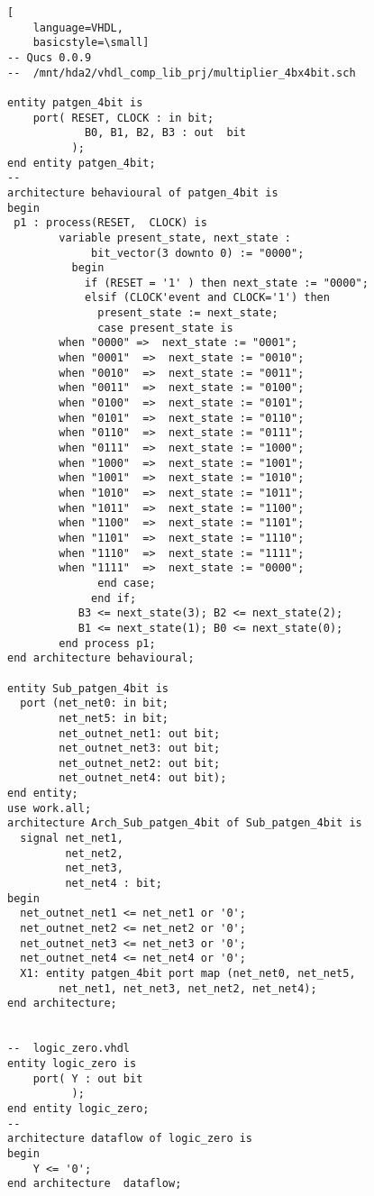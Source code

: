 \FloatBarrier
\begin{lstlisting}[
    language=VHDL,
    basicstyle=\small]
-- Qucs 0.0.9  
--  /mnt/hda2/vhdl_comp_lib_prj/multiplier_4bx4bit.sch

entity patgen_4bit is
	port( RESET, CLOCK : in bit;
	        B0, B1, B2, B3 : out  bit
	      );
end entity patgen_4bit;
--
architecture behavioural of patgen_4bit is
begin
 p1 : process(RESET,  CLOCK) is
        variable present_state, next_state : 
             bit_vector(3 downto 0) := "0000";
          begin	
            if (RESET = '1' ) then next_state := "0000";
            elsif (CLOCK'event and CLOCK='1') then
              present_state := next_state;
              case present_state is
	    when "0000" =>  next_state := "0001";   
	    when "0001"  =>  next_state := "0010"; 
	    when "0010"  =>  next_state := "0011";  
	    when "0011"  =>  next_state := "0100";   
	    when "0100"  =>  next_state := "0101";   
	    when "0101"  =>  next_state := "0110";   
	    when "0110"  =>  next_state := "0111";   
	    when "0111"  =>  next_state := "1000";   
	    when "1000"  =>  next_state := "1001";   
	    when "1001"  =>  next_state := "1010"; 
	    when "1010"  =>  next_state := "1011"; 
	    when "1011"  =>  next_state := "1100"; 
	    when "1100"  =>  next_state := "1101"; 
	    when "1101"  =>  next_state := "1110"; 
	    when "1110"  =>  next_state := "1111"; 
	    when "1111"  =>  next_state := "0000";
              end case;
             end if;
           B3 <= next_state(3); B2 <= next_state(2); 
           B1 <= next_state(1); B0 <= next_state(0);
        end process p1;
end architecture behavioural;

entity Sub_patgen_4bit is
  port (net_net0: in bit;
        net_net5: in bit;
        net_outnet_net1: out bit;
        net_outnet_net3: out bit;
        net_outnet_net2: out bit;
        net_outnet_net4: out bit);
end entity;
use work.all;
architecture Arch_Sub_patgen_4bit of Sub_patgen_4bit is
  signal net_net1,
         net_net2,
         net_net3,
         net_net4 : bit;
begin
  net_outnet_net1 <= net_net1 or '0';
  net_outnet_net2 <= net_net2 or '0';
  net_outnet_net3 <= net_net3 or '0';
  net_outnet_net4 <= net_net4 or '0';
  X1: entity patgen_4bit port map (net_net0, net_net5, 
        net_net1, net_net3, net_net2, net_net4);
end architecture;


--  logic_zero.vhdl
entity logic_zero is
	port( Y : out bit
	      );
end entity logic_zero;
--
architecture dataflow of logic_zero is
begin
	Y <= '0';
end architecture  dataflow;



\end{lstlisting}
